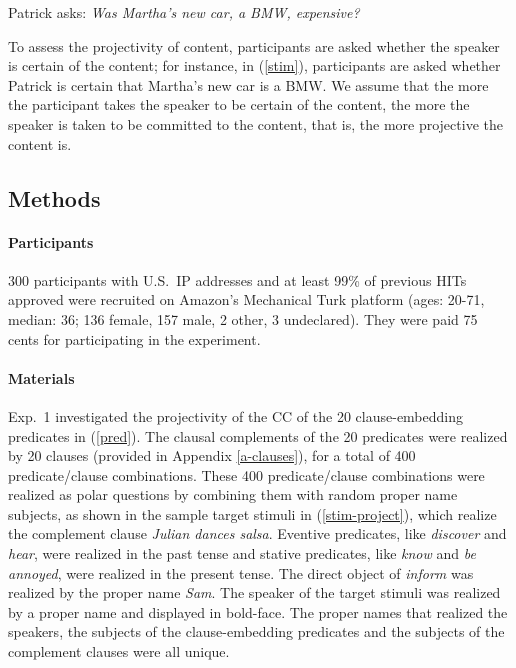 \documentclass[11pt,fleqn]{article}
\newcommand{\6}{\mbox{$[\hspace*{-.6mm}[$}}
\newcommand{\9}{\mbox{$]\hspace*{-.6mm}]$}}
\begin{document}
\begin{exe}

\ex\label{stim} Patrick asks: {\em Was Martha's new car, a BMW, expensive?} 

\end{exe}
To assess the projectivity of content, participants are asked whether the speaker is certain of the content; for instance, in (\ref{stim}), participants are asked whether Patrick is certain that Martha's new car is a BMW. We assume that the more the participant takes the speaker to be certain of the content, the more the speaker is taken to be committed to the content, that is, the more projective the content is.
 

\subsection{Methods}

\paragraph{Participants} 300 participants with U.S.\ IP addresses and at least 99\% of previous HITs approved were recruited on Amazon's Mechanical Turk platform (ages: 20-71, median: 36; 136 female, 157 male, 2 other, 3 undeclared). They were paid 75 cents for participating in the experiment.

\paragraph{Materials} Exp.~1 investigated the projectivity of the CC of the 20 clause-embedding predicates in (\ref{pred}).  The clausal complements of the 20 predicates were realized by 20 clauses (provided in Appendix \ref{a-clauses}), for a total of 400 predicate/clause combinations. These 400 predicate/clause combinations were realized as polar questions by combining them with random proper name subjects, as shown in the sample target stimuli in (\ref{stim-project}), which realize the complement clause {\em Julian dances salsa}. Eventive predicates, like {\em discover} and {\em hear}, were realized in the past tense and stative predicates, like {\em know} and {\em be annoyed}, were realized in the present tense. The direct object of {\em inform} was realized by the proper name {\em Sam}.  The speaker of the target stimuli was realized by a proper name and displayed in bold-face. The proper names that realized the speakers, the subjects of the clause-embedding predicates and the subjects of the complement clauses were all unique.
\end{document}

